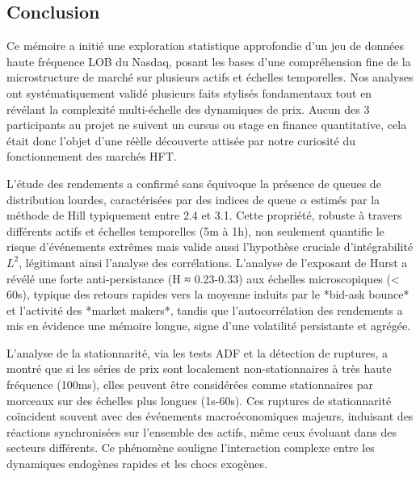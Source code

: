 \documentclass[10pt,a4paper]{article}
\theoremstyle{definition}
\theoremstyle{remark}
\begin{document}
\begin{itemize}
\newpage
\section*{Conclusion}
    Ce mémoire a initié une exploration statistique approfondie d'un jeu de données haute fréquence LOB du Nasdaq, posant les bases d'une compréhension fine de la microstructure de marché sur plusieurs actifs et échelles temporelles. Nos analyses ont systématiquement validé plusieurs faits stylisés fondamentaux tout en révélant la complexité multi-échelle des dynamiques de prix. Aucun des 3 participants au projet ne suivent un cursus ou stage en finance quantitative, cela était donc l'objet d'une réèlle découverte attisée par notre curiosité du fonctionnement des marchés HFT.

    \vspace{0.5cm}

    L'étude des rendements a confirmé sans équivoque la présence de queues de distribution lourdes, caractérisées par des indices de queue $\alpha$ estimés par la méthode de Hill typiquement entre 2.4 et 3.1. Cette propriété, robuste à travers différents actifs et échelles temporelles (5m à 1h), non seulement quantifie le risque d'événements extrêmes mais valide aussi l'hypothèse cruciale d'intégrabilité $L^2$, légitimant ainsi l'analyse des corrélations. L'analyse de l'exposant de Hurst a révélé une forte anti-persistance (H ≈ 0.23-0.33) aux échelles microscopiques (< 60s), typique des retours rapides vers la moyenne induits par le *bid-ask bounce* et l'activité des *market makers*, tandis que l'autocorrélation des rendements a mis en évidence une mémoire longue, signe d'une volatilité persistante et agrégée.

    \vspace{0.5cm}

    L'analyse de la stationnarité, via les tests ADF et la détection de ruptures, a montré que si les séries de prix sont localement non-stationnaires à très haute fréquence (100ms), elles peuvent être considérées comme stationnaires par morceaux sur des échelles plus longues (1s-60s). Ces ruptures de stationnarité coïncident souvent avec des événements macroéconomiques majeurs, induisant des réactions synchronisées sur l'ensemble des actifs, même ceux évoluant dans des secteurs différents. Ce phénomène souligne l'interaction complexe entre les dynamiques endogènes rapides et les chocs exogènes.

    \vspace{0.5cm}


\end{itemize}
\end{document}
